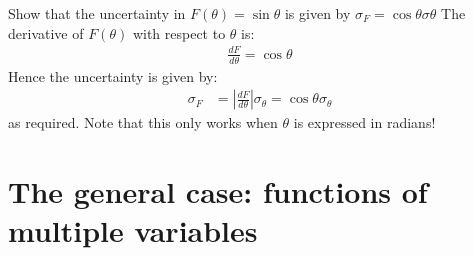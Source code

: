 \begin{example}{}{Show that the uncertainty in $F(\theta)=\sin\theta$ is given by $\sigma_{F}=\cos\theta\sigma\theta$}{}
The derivative of $F(\theta)$ with respect to $\theta$ is:
\begin{align*}
\frac{dF}{d\theta}=\cos\theta
\end{align*}
Hence the uncertainty is given by:
\begin{align*}
\sigma_{F}&=\left|\frac{dF}{d\theta}\right| \sigma_\theta=\cos\theta\sigma_\theta
\end{align*}
as required. Note that this only works when $\theta$ is expressed in radians!
\end{example}


\section{The general case: functions of multiple variables}


